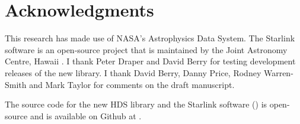 \documentclass[final,authoryear,5p,times,twocolumn]{elsarticle}
\begin{document}
\section{Acknowledgments}

This research has made use of NASA's Astrophysics Data System.  The
Starlink software is an open-source project that is maintained by the
Joint Astronomy Centre, Hawaii \citep{2014ASPC..485..391C}. I thank Peter Draper and David Berry
for testing development releases of the new library. I thank David
Berry, Danny Price, Rodney Warren-Smith and Mark Taylor for comments on the draft manuscript.

The source code for the new HDS library and the Starlink software
() is open-source and is available on Github at
.



\end{document}
